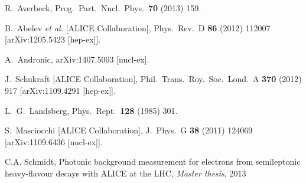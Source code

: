 \documentclass[a4paper,twocolumn,gsifonts,twoside]{gsipaper}
\begin{document}
\begin{thebibliography}{99}

  R.~Averbeck,
  Prog.\ Part.\ Nucl.\ Phys.\  {\bf 70} (2013) 159.

  B.~Abelev {\it et al.}  [ALICE Collaboration],
  Phys.\ Rev.\ D {\bf 86} (2012) 112007
  [arXiv:1205.5423 [hep-ex]].

  A.~Andronic,
  arXiv:1407.5003 [nucl-ex].
  
  J.~Schukraft [ALICE Collaboration],
  Phil.\ Trans.\ Roy.\ Soc.\ Lond.\ A {\bf 370} (2012) 917
  [arXiv:1109.4291 [hep-ex]].

  L.~G.~Landsberg,
  Phys.\ Rept.\  {\bf 128} (1985) 301.
  
  S.~Masciocchi [ALICE Collaboration],
  J.\ Phys.\ G {\bf 38} (2011) 124069
  [arXiv:1109.6436 [nucl-ex]].
  
 C.A. Schmidt, Photonic background measurement for electrons from semileptonic heavy-flavour decays with ALICE at the 
LHC, {\it Master thesis}, 2013 

\end{thebibliography}
\end{document}
